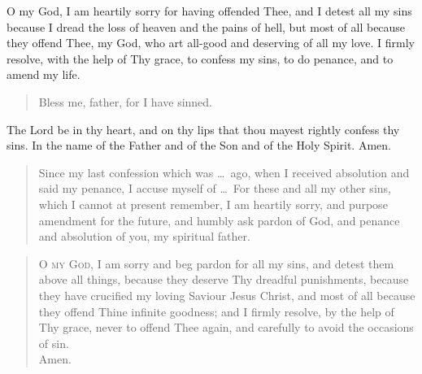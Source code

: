 O my God, I am heartily sorry for having offended Thee, and I detest all my sins because I dread the loss of heaven and the pains of hell, but most of all because they offend Thee, my God, who art all-good and deserving of all my love. I firmly resolve, with the help of Thy grace, to confess my sins, to do penance, and to amend my life.


\bigskip



\begin{quote}
Bless me, father, for I have sinned.
\end{quote}


The Lord be in thy heart, and on thy lips that thou mayest rightly confess thy sins. In the name of the Father and of the Son and of the Holy Spirit. Amen.


\begin{quote}
Since my last confession which was \ldots\ ago, when I received absolution and said my penance, I accuse myself of \ldots\ For these and all my other sins, 
which I cannot at present remember, I am heartily sorry, and purpose amendment for the future, and humbly ask pardon of God, and penance and absolution of you, my spiritual father.
\end{quote}


\begin{quote}


\lettrine{O}{ my God,} 
I am sorry and beg pardon for all my sins, 
and detest them above all things, 
because they deserve Thy dreadful punishments, 
because they have crucified my loving Saviour Jesus Christ, 
and most of all because they offend Thine infinite goodness; 
and I firmly resolve, 
by the help of Thy grace, 
never to offend Thee again, 
and carefully to avoid the occasions of sin.\\
Amen.

\end{quote}

